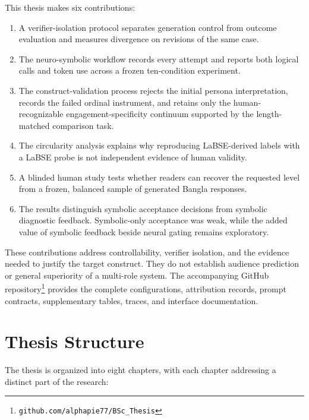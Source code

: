This thesis makes six contributions:

\begin{enumerate}
\item A verifier-isolation protocol separates generation control from outcome evaluation and measures divergence on revisions of the same case.
\item The neuro-symbolic workflow records every attempt and reports both logical calls and token use across a frozen ten-condition experiment.
\item The construct-validation process rejects the initial persona interpretation, records the failed ordinal instrument, and retains only the human-recognizable engagement-specificity continuum supported by the length-matched comparison task.
\item The circularity analysis explains why reproducing LaBSE-derived labels with a LaBSE probe is not independent evidence of human validity.
\item A blinded human study tests whether readers can recover the requested level from a frozen, balanced sample of generated Bangla responses.
\item The results distinguish symbolic acceptance decisions from symbolic diagnostic feedback. Symbolic-only acceptance was weak, while the added value of symbolic feedback beside neural gating remains exploratory.
\end{enumerate}

These contributions address controllability, verifier isolation, and the evidence needed to justify the target construct. They do not establish audience prediction or general superiority of a multi-role system. The accompanying GitHub repository\footnote{\texttt{github.com/alphapie77/BSc\_Thesis}} provides the complete configurations, attribution records, prompt contracts, supplementary tables, traces, and interface documentation.

\section{Thesis Structure}

The thesis is organized into eight chapters, with each chapter addressing a distinct part of the research:

